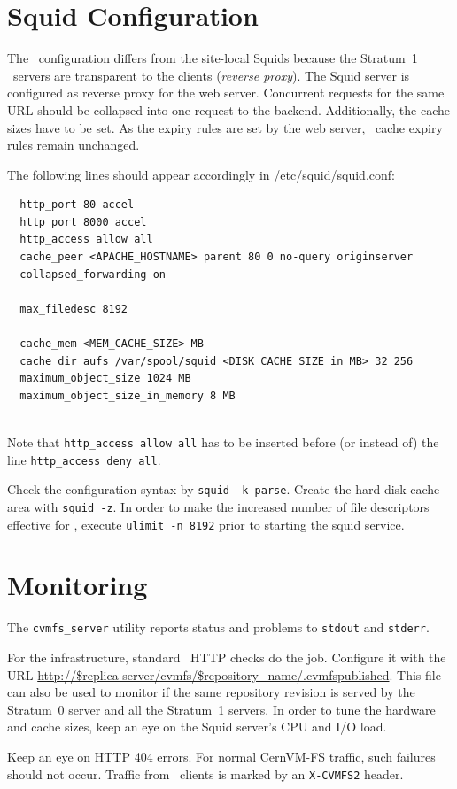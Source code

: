 \section{Squid Configuration}
The \squid\ configuration differs from the site-local Squids because the Stratum~1 \squid\ servers are transparent to the clients (\emph{reverse proxy}).
The Squid server is configured as reverse proxy for the web server.
Concurrent requests for the same URL should be collapsed into one request to the backend.
Additionally, the cache sizes have to be set.
As the expiry rules are set by the web server, \squid\ cache expiry rules remain unchanged.

The following lines should appear accordingly in /etc/squid/squid.conf:
\begin{verbatim}
  http_port 80 accel
  http_port 8000 accel
  http_access allow all
  cache_peer <APACHE_HOSTNAME> parent 80 0 no-query originserver
  collapsed_forwarding on

  max_filedesc 8192

  cache_mem <MEM_CACHE_SIZE> MB
  cache_dir aufs /var/spool/squid <DISK_CACHE_SIZE in MB> 32 256
  maximum_object_size 1024 MB
  maximum_object_size_in_memory 8 MB
\end{verbatim}
\quad\\
Note that \texttt{http\_access allow all} has to be inserted before (or instead of) the line \texttt{http\_access deny all}.

Check the configuration syntax by \texttt{squid -k parse}.
Create the hard disk cache area with \texttt{squid -z}. 
In order to make the increased number of file descriptors effective for \squid, execute \texttt{ulimit -n 8192} prior to starting the squid service.

\section{Monitoring}
The \texttt{cvmfs\_server} utility reports status and problems to \texttt{stdout} and \texttt{stderr}.

For the infrastructure, standard \nagios\ HTTP checks do the job.
Configure it with the URL \url{http://$replica-server/cvmfs/$repository_name/.cvmfspublished}.
This file can also be used to monitor if the same repository revision is served by the Stratum~0 server and all the Stratum~1 servers.
In order to tune the hardware and cache sizes, keep an eye on the Squid server's CPU and I/O load.

Keep an eye on HTTP 404 errors.
For normal CernVM-FS traffic, such failures should not occur.
Traffic from \cvmfs\ clients is marked by an \texttt{X-CVMFS2} header.
